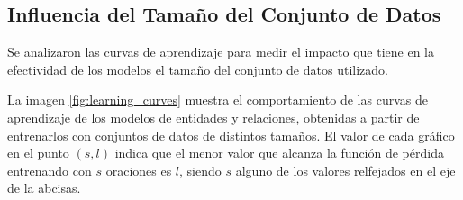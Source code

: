 \subsection{Influencia del Tamaño del Conjunto de Datos}

Se analizaron las curvas de aprendizaje para medir el impacto que tiene en la efectividad de los modelos el tamaño del conjunto de datos utilizado.

La imagen \ref{fig:learning_curves} muestra el comportamiento de las curvas de aprendizaje de los modelos de entidades y relaciones, obtenidas a partir de entrenarlos con conjuntos de datos de distintos tamaños.
El valor de cada gráfico en el punto $(s,l)$ indica que el menor valor que alcanza la función de pérdida entrenando con $s$ oraciones es $l$, siendo $s$ alguno de los valores relfejados en el eje de la abcisas.

